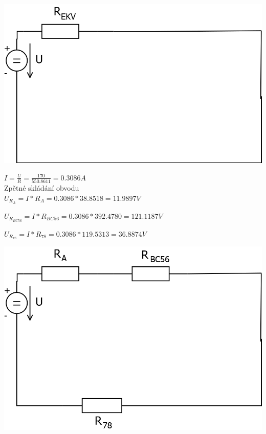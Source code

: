\documentclass{article}
\begin{document}
\begin{large}
\begin{center}
    \includegraphics[scale=0.3]{Pr1/Pr1_6.png}
\end{center}


    $I=\frac{U}{R}=\frac{170}{550.8611}=0.3086A$\\
    
    Zpětné skládání obvodu\\
    
    $U_{R_A}=I*R_A=0.3086*38.8518=11.9897V$
    
    $U_{R_{BC56}}=I*R_{BC56}=0.3086*392.4780=121.1187V$
    
    $U_{R_78}=I*R_78=0.3086*119.5313=36.8874V$


\begin{center}
    \includegraphics[scale=0.3]{Pr1/Pr1_5.png}
\end{center}

\newpage



\end{large}
\end{document}
